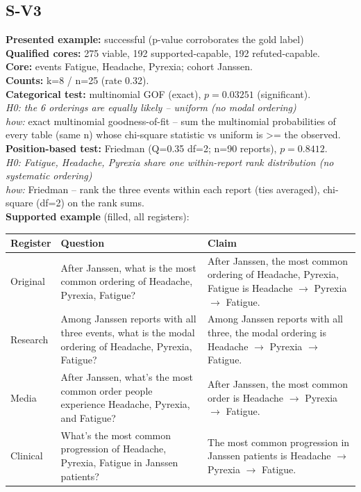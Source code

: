 \documentclass[11pt]{article}
\begin{document}
\subsection*{S-V3}
\textbf{Presented example:} successful (p-value corroborates the gold label) \\
\textbf{Qualified cores:} 275 viable, 192 supported-capable, 192 refuted-capable. \\
\textbf{Core:} events Fatigue, Headache, Pyrexia; cohort Janssen. \\
\textbf{Counts:} k=8 / n=25  (rate 0.32). \\
\textbf{Categorical test:} multinomial GOF (exact), $p = 0.03251$ (significant). \\
\emph{H0: the 6 orderings are equally likely -- uniform (no modal ordering)} \\
\emph{how:} exact multinomial goodness-of-fit -- sum the multinomial probabilities of every table (same n) whose chi-square statistic vs uniform is >= the observed. \\
\textbf{Position-based test:} Friedman (Q=0.35 df=2; n=90 reports), $p = 0.8412$. \\
\emph{H0: Fatigue, Headache, Pyrexia share one within-report rank distribution (no systematic ordering)} \\
\emph{how:} Friedman -- rank the three events within each report (ties averaged), chi-square (df=2) on the rank sums. \\
\textbf{Supported example} (filled, all registers): \\
\begin{tabularx}{\linewidth}{@{}l L L@{}}
\toprule
\textbf{Register} & \textbf{Question} & \textbf{Claim} \\
\midrule
Original & After Janssen, what is the most common ordering of Headache, Pyrexia, Fatigue? & After Janssen, the most common ordering of Headache, Pyrexia, Fatigue is Headache $\rightarrow$  Pyrexia $\rightarrow$  Fatigue. \\
Research & Among Janssen reports with all three events, what is the modal ordering of Headache, Pyrexia, Fatigue? & Among Janssen reports with all three, the modal ordering is Headache $\rightarrow$  Pyrexia $\rightarrow$  Fatigue. \\
Media & After Janssen, what's the most common order people experience Headache, Pyrexia, and Fatigue? & After Janssen, the most common order is Headache $\rightarrow$  Pyrexia $\rightarrow$  Fatigue. \\
Clinical & What's the most common progression of Headache, Pyrexia, Fatigue in Janssen patients? & The most common progression in Janssen patients is Headache $\rightarrow$  Pyrexia $\rightarrow$  Fatigue. \\
\bottomrule
\end{tabularx}
\end{document}
